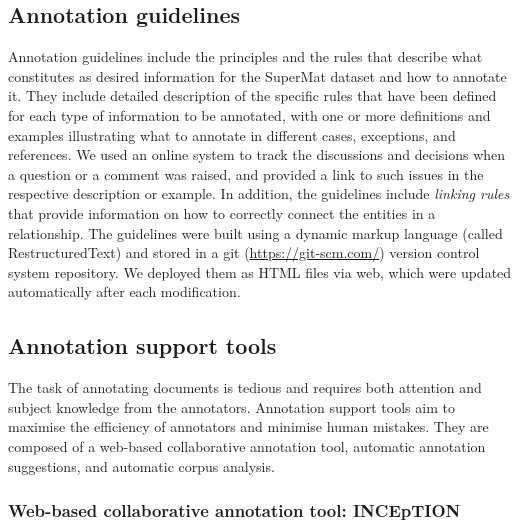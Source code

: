 \documentclass[fleqn,10pt]{wlscirep}
\begin{document}
\subsection*{Annotation guidelines}
\label{subsec:annotation-guidelines}
Annotation guidelines include the principles and the rules that describe  what constitutes as desired information for the SuperMat dataset and how to annotate it. They include detailed description of the specific rules that have been defined for each type of information to be annotated, with one or more definitions and examples illustrating what to annotate in different cases, exceptions, and references. We used an online system to track the discussions and decisions when a question or a comment was raised, and provided a link to such issues in the respective description or example. 
In addition, the guidelines include \textit{linking rules} that provide information on how to correctly connect the entities in a relationship. 
The guidelines were built using a dynamic markup language (called RestructuredText) and stored in a git (\url{https://git-scm.com/}) version control system repository. We deployed them as HTML files via web, which were updated automatically after each modification.

\subsection*{Annotation support tools}
\label{subsec:annotation-support-tool}
The task of annotating documents is tedious and requires both attention and subject knowledge from the annotators.
Annotation support tools aim to maximise the efficiency of annotators and minimise human mistakes. 
They are composed of a web-based collaborative annotation tool, automatic annotation suggestions, and automatic corpus analysis. 

\subsubsection*{Web-based collaborative annotation tool: INCEpTION}
\label{subsec:annotation-tool}
\end{document}

